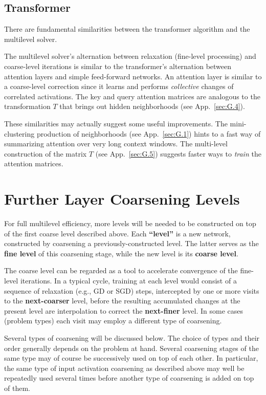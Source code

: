 \documentclass{article} %
\begin{document}
\subsection{Transformer}
There are fundamental similarities between the transformer algorithm \cite{transformer} and the multilevel solver.

The multilevel solver's alternation between relaxation (fine-level processing) and coarse-level iterations is similar to the transformer's alternation between attention layers and simple feed-forward networks. An attention layer is similar to a coarse-level correction since it learns and performs {\it collective} changes of correlated activations. The key and query attention matrices are analogous to the transformation $T$ that brings out hidden neighborhoods (see App.~\ref{sec:G.4}).

These similarities may actually suggest some useful improvements. The mini-clustering production of neighborhoods (see App.~\ref{sec:G.1}) hints to a fast way of summarizing attention over very long context windows. The multi-level construction of the matrix $T$ (see App.~\ref{sec:G.5}) suggests faster ways to {\it train} the attention matrices.

\section{Further Layer Coarsening Levels}
\label{sec:further_coarsening}
For full multilevel efficiency, more levels will be needed to be constructed on top of the first coarse level described above. Each \textbf{``level''} is a new network, constructed by coarsening a previously-constructed level. The latter serves as the \textbf{fine level} of this coarsening stage, while the new level is its \textbf{coarse level}.

The coarse level can be regarded as a tool to accelerate convergence of the fine-level iterations. In a typical cycle, training at each level would consist of a sequence of relaxation (e.g., GD or SGD) steps, intercepted by one or more visits to the \textbf{next-coarser} level, before the resulting accumulated changes at the present level are interpolation to correct the \textbf{next-finer} level. In some cases (problem types) each visit may employ a different type of coarsening.

Several types of coarsening will be discussed below. The choice of types and their order generally depends on the problem at hand.  Several coarsening stages of the same type may of course be successively used on top of each other. In particular, the same type of input activation coarsening as described above may well be repeatedly used several times before another type of coarsening is added on top of them.
\end{document}
